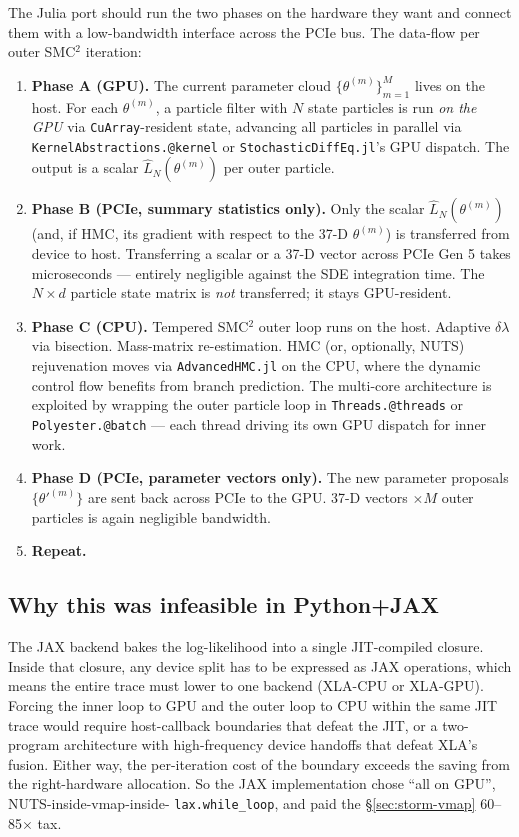 \documentclass[11pt,a4paper]{article}
\begin{document}
The Julia port should run the two phases on the hardware they want
and connect them with a low-bandwidth interface across the PCIe
bus. The data-flow per outer SMC$^2$ iteration:

\begin{enumerate}
\item \textbf{Phase A (GPU).} The current parameter cloud
  $\{\theta^{(m)}\}_{m=1}^M$ lives on the host. For each
  $\theta^{(m)}$, a particle filter with $N$ state particles
  is run \emph{on the GPU} via
  \texttt{CuArray}-resident state, advancing all particles in
  parallel via \texttt{KernelAbstractions.@kernel} or
  \texttt{StochasticDiffEq.jl}'s GPU dispatch. The output is a
  scalar $\widehat{L}_N(\theta^{(m)})$ per outer particle.
\item \textbf{Phase B (PCIe, summary statistics only).} Only the
  scalar $\widehat{L}_N(\theta^{(m)})$ (and, if HMC, its gradient
  with respect to the 37-D $\theta^{(m)}$) is transferred from
  device to host. Transferring a scalar or a 37-D vector across
  PCIe Gen 5 takes microseconds --- entirely negligible against the
  SDE integration time. The $N \times d$ particle state matrix is
  \emph{not} transferred; it stays GPU-resident.
\item \textbf{Phase C (CPU).} Tempered SMC$^2$ outer loop runs on
  the host. Adaptive $\delta\lambda$ via bisection. Mass-matrix
  re-estimation. HMC (or, optionally, NUTS) rejuvenation moves
  via \texttt{AdvancedHMC.jl} on the CPU, where the dynamic
  control flow benefits from branch prediction. The
  multi-core architecture is exploited by wrapping the outer
  particle loop in \texttt{Threads.@threads} or
  \texttt{Polyester.@batch} --- each thread driving its own
  GPU dispatch for inner work.
\item \textbf{Phase D (PCIe, parameter vectors only).} The new
  parameter proposals $\{\theta'^{(m)}\}$ are sent back across
  PCIe to the GPU. 37-D vectors $\times M$ outer particles is
  again negligible bandwidth.
\item \textbf{Repeat.}
\end{enumerate}

\subsection{Why this was infeasible in Python+JAX}

The JAX backend bakes the log-likelihood into a single JIT-compiled
closure. Inside that closure, any device split has to be expressed
as JAX operations, which means the entire trace must lower to one
backend (XLA-CPU or XLA-GPU). Forcing the inner loop to GPU and
the outer loop to CPU within the same JIT trace would require
host-callback boundaries that defeat the JIT, or a two-program
architecture with high-frequency device handoffs that defeat
XLA's fusion. Either way, the per-iteration cost of the boundary
exceeds the saving from the right-hardware allocation. So the
JAX implementation chose ``all on GPU'', NUTS-inside-vmap-inside-
\texttt{lax.while\_loop}, and paid the §\ref{sec:storm-vmap} 60--
85$\times$ tax.
\end{document}
